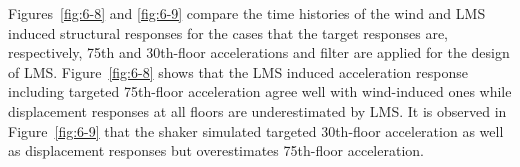 Figures~\ref{fig:6-8} and \ref{fig:6-9} compare the time histories of the wind and LMS induced structural responses for the cases that the target responses are, respectively, 75th and 30th-floor accelerations and filter are applied for the design of LMS. Figure~\ref{fig:6-8} shows that the LMS induced acceleration response including targeted 75th-floor acceleration agree well with wind-induced ones while displacement responses at all floors are underestimated by LMS. It is observed in Figure~\ref{fig:6-9} that the shaker simulated targeted 30th-floor acceleration as well as displacement responses but overestimates 75th-floor acceleration.

\begin{figure}[!ht]
\centering
{}
\end{figure}
